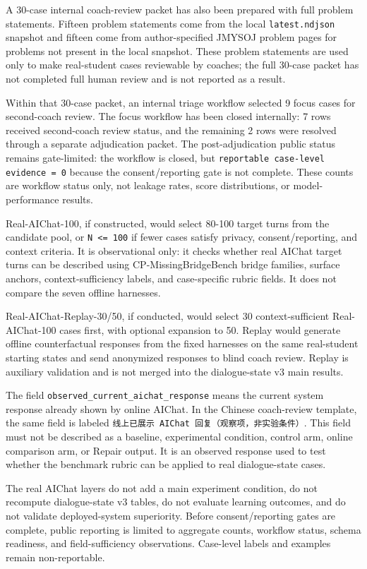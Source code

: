 \documentclass[11pt]{article}
\begin{document}
A 30-case internal coach-review packet has also been prepared with full problem statements. Fifteen problem statements come from the local \texttt{latest.ndjson} snapshot and fifteen come from author-specified JMYSOJ problem pages for problems not present in the local snapshot. These problem statements are used only to make real-student cases reviewable by coaches; the full 30-case packet has not completed full human review and is not reported as a result.

Within that 30-case packet, an internal triage workflow selected 9 focus cases for second-coach review. The focus workflow has been closed internally: 7 rows received second-coach review status, and the remaining 2 rows were resolved through a separate adjudication packet. The post-adjudication public status remains gate-limited: the workflow is closed, but \texttt{reportable case-level evidence = 0} because the consent/reporting gate is not complete. These counts are workflow status only, not leakage rates, score distributions, or model-performance results.

Real-AIChat-100, if constructed, would select 80-100 target turns from the candidate pool, or \texttt{N <= 100} if fewer cases satisfy privacy, consent/reporting, and context criteria. It is observational only: it checks whether real AIChat target turns can be described using CP-MissingBridgeBench bridge families, surface anchors, context-sufficiency labels, and case-specific rubric fields. It does not compare the seven offline harnesses.

Real-AIChat-Replay-30/50, if conducted, would select 30 context-sufficient Real-AIChat-100 cases first, with optional expansion to 50. Replay would generate offline counterfactual responses from the fixed harnesses on the same real-student starting states and send anonymized responses to blind coach review. Replay is auxiliary validation and is not merged into the dialogue-state v3 main results.

The field \texttt{observed\_current\_aichat\_response} means the current system response already shown by online AIChat. In the Chinese coach-review template, the same field is labeled \texttt{线上已展示 AIChat 回复（观察项，非实验条件）}. This field must not be described as a baseline, experimental condition, control arm, online comparison arm, or Repair output. It is an observed response used to test whether the benchmark rubric can be applied to real dialogue-state cases.

The real AIChat layers do not add a main experiment condition, do not recompute dialogue-state v3 tables, do not evaluate learning outcomes, and do not validate deployed-system superiority. Before consent/reporting gates are complete, public reporting is limited to aggregate counts, workflow status, schema readiness, and field-sufficiency observations. Case-level labels and examples remain non-reportable.



\end{document}
